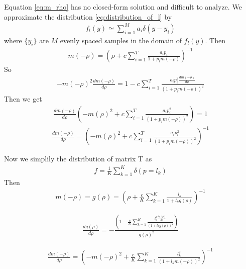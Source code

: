 \documentclass[12pt,journal,draftclsnofoot,onecolumn]{IEEEtran}
\begin{document}
Equation \eqref{eq:m_rho} has no closed-form solution and difficult to analyze. We approximate the distribution \eqref{eq:distribution_of_l} by
\begin{eqnarray}
f_l(y) \simeq \sum_{i = 1}^{M}a_i\delta(y - y_i)
\end{eqnarray}
where $\{y_i\}$ are $M$ evenly spaced samples in the domain of $f_l(y)$.
Then 
\begin{eqnarray}
m(-\rho) = \left(\rho + c\sum_{i=1}^{T}\frac{a_ip_i}{1 + p_im(-\rho)}\right)^{-1}
\end{eqnarray}
So
\begin{eqnarray}
-m(-\rho)^2\frac{dm(-\rho)}{d\rho} = 1 - c\sum_{i=1}^{T}\frac{a_ip_i^2\frac{dm(-\rho)}{d\rho}}{(1 + p_im(-\rho))^2}
\end{eqnarray}
Then we get
\begin{eqnarray}
\frac{dm(-\rho)}{d\rho}\left(-m(\rho)^2+c\sum_{i=1}^{T}\frac{a_ip_i^2}{(1+p_im(-\rho))^2}\right) = 1
\end{eqnarray}
\begin{eqnarray}
\frac{dm(-\rho)}{d\rho} = \left(-m(\rho)^2+c\sum_{i=1}^{T}\frac{a_ip_i^2}{(1+p_im(-\rho))^2}\right)^{-1}
\end{eqnarray}

Now we simplily the distribution of matrix T as
\begin{eqnarray}
f = \frac{1}{K}\sum_{k = 1}^{K}\delta(p = l_k)
\end{eqnarray}
Then
\begin{eqnarray}
m(-\rho) = g(\rho) = \left(\rho + \frac{c}{K}\sum_{k=1}^{K}\frac{l_k}{1 + l_kg(\rho)}\right)^{-1}
\end{eqnarray}

\begin{eqnarray}
\frac{dg(\rho)}{d\rho} = -\frac{\left(1 - \frac{c}{K}\sum_{k=1}^{K}\frac{l_k^2\frac{dg(\rho)}{d\rho}}{\left(1 + l_kg(\rho)\right)^2}\right)}{g(\rho)^{2}}
\end{eqnarray}

\begin{eqnarray}
\frac{dm(-\rho)}{d\rho} = \left(-m(-\rho)^2+\frac{c}{K}\sum_{k=1}^{K}\frac{l_k^2}{(1+l_km(-\rho))^2}\right)^{-1}
\end{eqnarray}
\end{document}
